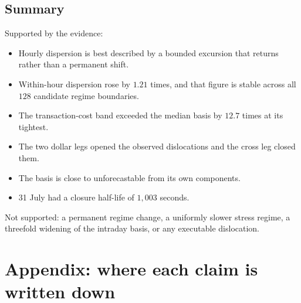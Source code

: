 \documentclass[11pt,a4paper]{article}
\begin{document}
\subsection{Summary}

Supported by the evidence:

\begin{itemize}[leftmargin=1.6em,itemsep=3pt]
  \item Hourly dispersion is best described by a bounded excursion that returns rather than
  a permanent shift.
  \item Within-hour dispersion rose by $1.21$ times, and that figure is stable across all
  $128$ candidate regime boundaries.
  \item The transaction-cost band exceeded the median basis by $12.7$ times at its tightest.
  \item The two dollar legs opened the observed dislocations and the cross leg closed them.
  \item The basis is close to unforecastable from its own components.
  \item 31 July had a closure half-life of $1{,}003$ seconds.
\end{itemize}

Not supported: a permanent regime change, a uniformly slower stress regime, a threefold
widening of the intraday basis, or any executable dislocation.

\section*{Appendix: where each claim is written down}
\end{document}
